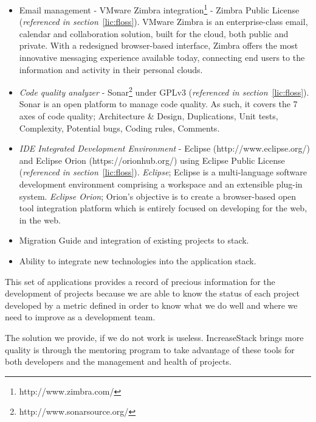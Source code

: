 \documentclass[11pt]{scrartcl}
\begin{document}
\begin{itemize}
\begin{itemize}
        \item \emph{Continuous integration} - Jenkins\footnote{http://jenkins-ci.org/} under MIT License (\emph{referenced in section}~\ref{lic:floss}). An extendable open source continuous integration server.
    \end{itemize}
    \item Email management - VMware Zimbra integration\footnote{http://www.zimbra.com/} - Zimbra Public License (\emph{referenced in section}~\ref{lic:floss}). VMware Zimbra is an enterprise-class email, calendar and collaboration solution, built for the cloud, both public and private. With a redesigned browser-based interface, Zimbra offers the most innovative messaging experience available today, connecting end users to the information and activity in their personal clouds.
    \item \emph{Code quality analyzer} - Sonar\footnote{http://www.sonarsource.org/} under GPLv3 (\emph{referenced in section}~\ref{lic:floss}). Sonar is an open platform to manage code quality. As such, it covers the 7 axes of code quality; Architecture \& Design, Duplications, Unit tests, Complexity, Potential bugs, Coding rules, Comments.
    \item \emph{IDE Integrated Development Environment} - Eclipse (http://www.eclipse.org/) and Eclipse Orion (https://orionhub.org/) using Eclipse Public License (\emph{referenced in section}~\ref{lic:floss}). \emph{Eclipse}; Eclipse is a multi-language software development environment comprising a workspace and an extensible plug-in system. \emph{Eclipse Orion}; Orion's objective is to create a browser-based open tool integration platform which is entirely focused on developing for the web, in the web.
    \item Migration Guide and integration of existing projects to stack.
    \item Ability to integrate new technologies into the application stack.
\end{itemize}

\par This set of applications provides a record of precious information for the development of projects because we are able to know the status of each project developed by a metric defined in order to know what we do well and where we need to improve as a development team.

\par The solution we provide, if we do not work is useless. IncreaseStack brings more quality is through the mentoring program to take advantage of these tools for both developers and the management and health of projects.
\end{document}
